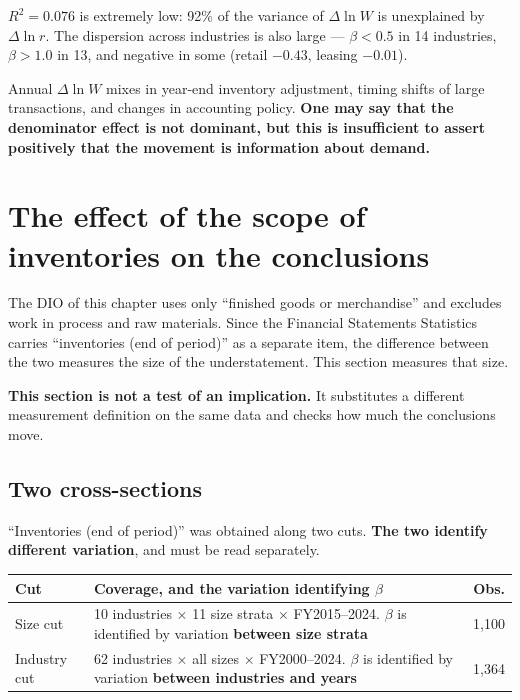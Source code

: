 \begin{remark}
$R^2=0.076$ is extremely low: 92\% of the variance of $\Delta\ln W$ is unexplained by
$\Delta\ln r$. The dispersion across industries is also large — $\beta<0.5$ in 14 industries,
$\beta>1.0$ in 13, and negative in some (retail $-0.43$, leasing $-0.01$).

Annual $\Delta\ln W$ mixes in year-end inventory adjustment, timing shifts of large transactions,
and changes in accounting policy. \textbf{One may say that the denominator effect is not dominant,
but this is insufficient to assert positively that the movement is information about demand.}
\end{remark}

\section{The effect of the scope of inventories on the conclusions}
\label{sec:inventory-scope}

The $\mathrm{DIO}$ of this chapter uses only ``finished goods or merchandise'' and excludes
work in process and raw materials. Since the Financial Statements Statistics carries
``inventories (end of period)'' as a separate item, the difference between the two measures the
size of the understatement. This section measures that size.

\textbf{This section is not a test of an implication.} It substitutes a different measurement
definition on the same data and checks how much the conclusions move.

\subsection{Two cross-sections}

``Inventories (end of period)'' was obtained along two cuts. \textbf{The two identify different
variation}, and must be read separately.

\begin{center}
\begin{tabularx}{\textwidth}{@{}lXr@{}}
\toprule
Cut & Coverage, and the variation identifying $\beta$ & Obs. \\
\midrule
Size cut & 10 industries $\times$ 11 size strata $\times$ FY2015--2024. $\beta$ is identified by variation \textbf{between size strata} & 1,100 \\
Industry cut & 62 industries $\times$ all sizes $\times$ FY2000--2024. $\beta$ is identified by variation \textbf{between industries and years} & 1,364 \\
\bottomrule
\end{tabularx}
\label{tab:inventory-cuts}
\end{center}

